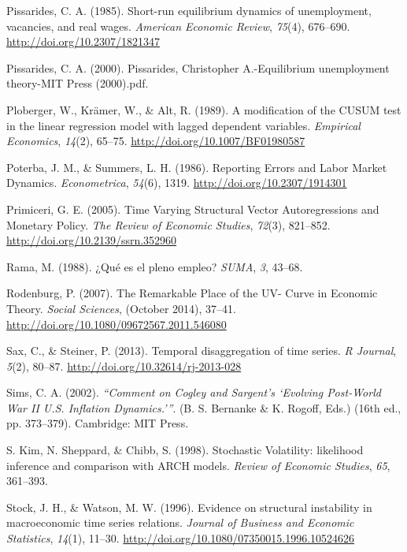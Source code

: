 \documentclass[12pt,oneside]{reedthesis}
\begin{document}
\leavevmode\hypertarget{ref-Pissarides1985}{}%
Pissarides, C. A. (1985). Short-run equilibrium dynamics of unemployment, vacancies, and real wages. \emph{American Economic Review}, \emph{75}(4), 676--690. \url{http://doi.org/10.2307/1821347}

\leavevmode\hypertarget{ref-Pissarides2000}{}%
Pissarides, C. A. (2000). Pissarides, Christopher A.-Equilibrium unemployment theory-MIT Press (2000).pdf.

\leavevmode\hypertarget{ref-Ploberger1989}{}%
Ploberger, W., Krämer, W., \& Alt, R. (1989). A modification of the CUSUM test in the linear regression model with lagged dependent variables. \emph{Empirical Economics}, \emph{14}(2), 65--75. \url{http://doi.org/10.1007/BF01980587}

\leavevmode\hypertarget{ref-Poterba1986}{}%
Poterba, J. M., \& Summers, L. H. (1986). Reporting Errors and Labor Market Dynamics. \emph{Econometrica}, \emph{54}(6), 1319. \url{http://doi.org/10.2307/1914301}

\leavevmode\hypertarget{ref-Primiceri2005}{}%
Primiceri, G. E. (2005). Time Varying Structural Vector Autoregressions and Monetary Policy. \emph{The Review of Economic Studies}, \emph{72}(3), 821--852. \url{http://doi.org/10.2139/ssrn.352960}

\leavevmode\hypertarget{ref-Rama1988}{}%
Rama, M. (1988). ¿Qué es el pleno empleo? \emph{SUMA}, \emph{3}, 43--68.

\leavevmode\hypertarget{ref-Rodenburg2007}{}%
Rodenburg, P. (2007). The Remarkable Place of the UV- Curve in Economic Theory. \emph{Social Sciences}, (October 2014), 37--41. \url{http://doi.org/10.1080/09672567.2011.546080}

\leavevmode\hypertarget{ref-Sax2013}{}%
Sax, C., \& Steiner, P. (2013). Temporal disaggregation of time series. \emph{R Journal}, \emph{5}(2), 80--87. \url{http://doi.org/10.32614/rj-2013-028}

\leavevmode\hypertarget{ref-Sims2002}{}%
Sims, C. A. (2002). \emph{``Comment on Cogley and Sargent's `Evolving Post-World War II U.S. Inflation Dynamics.'''}. (B. S. Bernanke \& K. Rogoff, Eds.) (16th ed., pp. 373--379). Cambridge: MIT Press.

\leavevmode\hypertarget{ref-Kim1998}{}%
S. Kim, N. Sheppard, \& Chibb, S. (1998). Stochastic Volatility: likelihood inference and comparison with ARCH models. \emph{Review of Economic Studies}, \emph{65}, 361--393.

\leavevmode\hypertarget{ref-Stock1996}{}%
Stock, J. H., \& Watson, M. W. (1996). Evidence on structural instability in macroeconomic time series relations. \emph{Journal of Business and Economic Statistics}, \emph{14}(1), 11--30. \url{http://doi.org/10.1080/07350015.1996.10524626}
\end{document}
